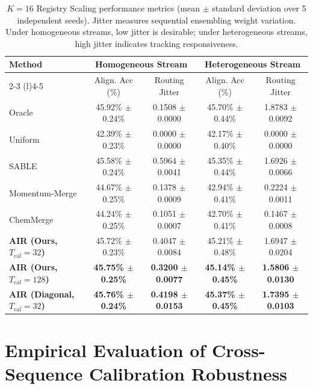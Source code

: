 \documentclass{article}
\theoremstyle{plain}
\theoremstyle{definition}
\theoremstyle{remark}
\begin{document}
\begin{table}[h]
\caption{$K=16$ Registry Scaling performance metrics (mean $\pm$ standard deviation over 5 independent seeds). Jitter measures sequential ensembling weight variation. Under homogeneous streams, low jitter is desirable; under heterogeneous streams, high jitter indicates tracking responsiveness.}
\label{tab:k16_results}
\vskip 0.1in
\begin{center}
\begin{small}
\begin{sc}
\begin{tabular}{lcccc}
\toprule
Method & \multicolumn{2}{c}{Homogeneous Stream} & \multicolumn{2}{c}{Heterogeneous Stream} \\
\cmidrule(r){2-3} \cmidrule(l){4-5}
& Align. Acc (\%) & Routing Jitter & Align. Acc (\%) & Routing Jitter \\
\midrule
Oracle & 45.92\% $\pm$ 0.24\% & 0.1508 $\pm$ 0.0000 & 45.70\% $\pm$ 0.44\% & 1.8783 $\pm$ 0.0092 \\
Uniform & 42.39\% $\pm$ 0.23\% & 0.0000 $\pm$ 0.0000 & 42.17\% $\pm$ 0.40\% & 0.0000 $\pm$ 0.0000 \\
SABLE & 45.58\% $\pm$ 0.24\% & 0.5964 $\pm$ 0.0041 & 45.35\% $\pm$ 0.44\% & 1.6926 $\pm$ 0.0066 \\
Momentum-Merge & 44.67\% $\pm$ 0.25\% & 0.1378 $\pm$ 0.0009 & 42.94\% $\pm$ 0.41\% & 0.2224 $\pm$ 0.0011 \\
ChemMerge & 44.24\% $\pm$ 0.25\% & 0.1051 $\pm$ 0.0007 & 42.70\% $\pm$ 0.41\% & 0.1467 $\pm$ 0.0008 \\
\midrule
\textbf{AIR (Ours, $T_{\text{cal}}=32$)} & 45.72\% $\pm$ 0.23\% & 0.4047 $\pm$ 0.0084 & 45.21\% $\pm$ 0.48\% & 1.6947 $\pm$ 0.0204 \\
\textbf{AIR (Ours, $T_{\text{cal}}=128$)} & \textbf{45.75\% $\pm$ 0.25\%} & \textbf{0.3200 $\pm$ 0.0077} & \textbf{45.14\% $\pm$ 0.45\%} & \textbf{1.5806 $\pm$ 0.0130} \\
\textbf{AIR (Diagonal, $T_{\text{cal}}=32$)} & \textbf{45.76\% $\pm$ 0.24\%} & \textbf{0.4198 $\pm$ 0.0153} & \textbf{45.37\% $\pm$ 0.45\%} & \textbf{1.7395 $\pm$ 0.0103} \\
\bottomrule
\end{tabular}
\end{sc}
\end{small}
\end{center}
\end{table}


\section{Empirical Evaluation of Cross-Sequence Calibration Robustness}
\label{app:cross_calibration_results}
\end{document}
